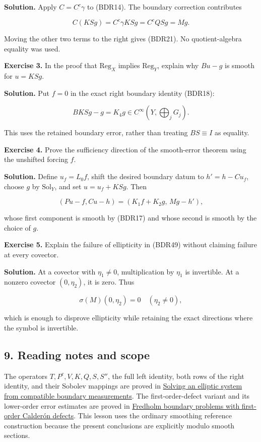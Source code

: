 \documentclass[
  11pt,
]{article}
\begin{document}
\textbf{Solution.} Apply \(C=C^c\gamma\) to (BDR14). The boundary
correction contributes

\[
 C(KSg)=C^c\gamma KSg=C^cQSg=Mg.
 \tag{BDR51}
\]

Moving the other two terms to the right gives (BDR21). No
quotient-algebra equality was used.

\textbf{Exercise 3.} In the proof that \(\mathrm{Reg}_X\) implies
\(\mathrm{Reg}_Y\), explain why \(Bu-g\) is smooth for \(u=KSg\).

\textbf{Solution.} Put \(f=0\) in the exact right boundary identity
(BDR18):

\[
 BKSg-g=K_4g\in C^\infty(Y,\textstyle\bigoplus_jG_j).
 \tag{BDR52}
\]

This uses the retained boundary error, rather than treating
\(BS\equiv I\) as equality.

\textbf{Exercise 4.} Prove the sufficiency direction of the smooth-error
theorem using the unshifted forcing \(f\).

\textbf{Solution.} Define \(u_f=L_0f\), shift the desired boundary datum
to \(h'=h-Cu_f\), choose \(g\) by \(\mathrm{Sol}_Y\), and set
\(u=u_f+KSg\). Then

\[
 (Pu-f,Cu-h)=(K_1f+K_2g,\,Mg-h'),
 \tag{BDR53}
\]

whose first component is smooth by (BDR17) and whose second is smooth by
the choice of \(g\).

\textbf{Exercise 5.} Explain the failure of ellipticity in (BDR49)
without claiming failure at every covector.

\textbf{Solution.} At a covector with \(\eta_1\ne0\), multiplication by
\(\eta_1\) is invertible. At a nonzero covector \((0,\eta_2)\), it is
zero. Thus

\[
 \sigma(M)(0,\eta_2)=0\quad(\eta_2\ne0),
 \tag{BDR54}
\]

which is enough to disprove ellipticity while retaining the exact
directions where the symbol is invertible.

\subsection{9. Reading notes and scope}\label{reading-notes-and-scope}

The operators \(T,P^c,V,K,Q,S,S''\), the full left identity, both rows
of the right identity, and their Sobolev mappings are proved in
\href{general-boundary-fredholm.pdf}{Solving an elliptic system from
compatible boundary measurements}. The first-order-defect variant and
its lower-order error estimates are proved in
\href{generalized-collar-fredholm.pdf}{Fredholm boundary problems with
first-order Calderón defects}. This lesson uses the ordinary smoothing
reference construction because the present conclusions are explicitly
modulo smooth sections.
\end{document}
